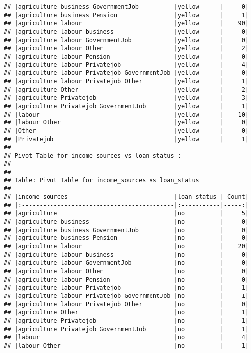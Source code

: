 \documentclass[
]{article}
\begin{document}
\begin{verbatim}
## |agriculture business GovernmentJob          |yellow      |     0|
## |agriculture business Pension                |yellow      |     1|
## |agriculture labour                          |yellow      |    90|
## |agriculture labour business                 |yellow      |     0|
## |agriculture labour GovernmentJob            |yellow      |     0|
## |agriculture labour Other                    |yellow      |     2|
## |agriculture labour Pension                  |yellow      |     0|
## |agriculture labour Privatejob               |yellow      |     4|
## |agriculture labour Privatejob GovernmentJob |yellow      |     0|
## |agriculture labour Privatejob Other         |yellow      |     1|
## |agriculture Other                           |yellow      |     2|
## |agriculture Privatejob                      |yellow      |     3|
## |agriculture Privatejob GovernmentJob        |yellow      |     1|
## |labour                                      |yellow      |    10|
## |labour Other                                |yellow      |     0|
## |Other                                       |yellow      |     0|
## |Privatejob                                  |yellow      |     1|
## 
## Pivot Table for income_sources vs loan_status :
## 
## 
## Table: Pivot Table for income_sources vs loan_status
## 
## |income_sources                              |loan_status | Count|
## |:-------------------------------------------|:-----------|-----:|
## |agriculture                                 |no          |     5|
## |agriculture business                        |no          |     0|
## |agriculture business GovernmentJob          |no          |     0|
## |agriculture business Pension                |no          |     0|
## |agriculture labour                          |no          |    20|
## |agriculture labour business                 |no          |     0|
## |agriculture labour GovernmentJob            |no          |     0|
## |agriculture labour Other                    |no          |     0|
## |agriculture labour Pension                  |no          |     0|
## |agriculture labour Privatejob               |no          |     1|
## |agriculture labour Privatejob GovernmentJob |no          |     1|
## |agriculture labour Privatejob Other         |no          |     0|
## |agriculture Other                           |no          |     1|
## |agriculture Privatejob                      |no          |     1|
## |agriculture Privatejob GovernmentJob        |no          |     1|
## |labour                                      |no          |     4|
## |labour Other                                |no          |     1|

\end{verbatim}
\end{document}
